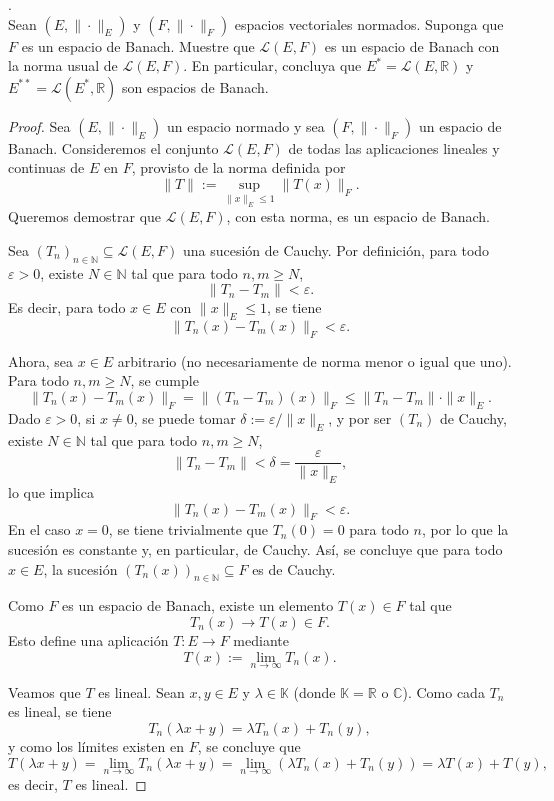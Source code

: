.\\
Sean $(E, \| \cdot \|_E)$ y $(F, \| \cdot \|_F)$ espacios vectoriales normados. Suponga que $F$ es un espacio de Banach. Muestre que $\mathcal{L}(E, F)$ es un espacio de Banach con la norma usual de $\mathcal{L}(E, F)$. En particular, concluya que $E^* = \mathcal{L}(E, \mathbb{R})$ y $E^{**} = \mathcal{L}(E^*, \mathbb{R})$ son espacios de Banach.
\hfill

\begin{proof}
\hfill

Sea \( (E, \|\cdot\|_E) \) un espacio normado y sea \( (F, \|\cdot\|_F) \) un espacio de Banach. Consideremos el conjunto \( \mathcal{L}(E, F) \) de todas las aplicaciones lineales y continuas de \( E \) en \( F \), provisto de la norma definida por
\[
\|T\| := \sup_{\|x\|_E \leq 1} \|T(x)\|_F.
\]
Queremos demostrar que \( \mathcal{L}(E, F) \), con esta norma, es un espacio de Banach.

Sea \( (T_n)_{n \in \mathbb{N}} \subseteq \mathcal{L}(E, F) \) una sucesión de Cauchy. Por definición, para todo \( \varepsilon > 0 \), existe \( N \in \mathbb{N} \) tal que para todo \( n, m \geq N \),
\[
\|T_n - T_m\| < \varepsilon.
\]
Es decir, para todo \( x \in E \) con \( \|x\|_E \leq 1 \), se tiene
\[
\|T_n(x) - T_m(x)\|_F < \varepsilon.
\]

Ahora, sea \( x \in E \) arbitrario (no necesariamente de norma menor o igual que uno). Para todo \( n, m \geq N \), se cumple
\[
\|T_n(x) - T_m(x)\|_F = \|(T_n - T_m)(x)\|_F \leq \|T_n - T_m\| \cdot \|x\|_E.
\]
Dado \( \varepsilon > 0 \), si \( x \neq 0 \), se puede tomar \( \delta := \varepsilon / \|x\|_E \), y por ser \( (T_n) \) de Cauchy, existe \( N \in \mathbb{N} \) tal que para todo \( n, m \geq N \),
\[
\|T_n - T_m\| < \delta = \frac{\varepsilon}{\|x\|_E},
\]
lo que implica
\[
\|T_n(x) - T_m(x)\|_F < \varepsilon.
\]
En el caso \( x = 0 \), se tiene trivialmente que \( T_n(0) = 0 \) para todo \( n \), por lo que la sucesión es constante y, en particular, de Cauchy. Así, se concluye que para todo \( x \in E \), la sucesión \( (T_n(x))_{n \in \mathbb{N}} \subseteq F \) es de Cauchy.

Como \( F \) es un espacio de Banach, existe un elemento \( T(x) \in F \) tal que
\[
T_n(x) \to T(x) \in F.
\]
Esto define una aplicación \( T: E \to F \) mediante
\[
T(x) := \lim_{n \to \infty} T_n(x).
\]

Veamos que \( T \) es lineal. Sean \( x, y \in E \) y \( \lambda \in \mathbb{K} \) (donde \( \mathbb{K} = \mathbb{R} \) o \( \mathbb{C} \)). Como cada \( T_n \) es lineal, se tiene
\[
T_n(\lambda x + y) = \lambda T_n(x) + T_n(y),
\]
y como los límites existen en \( F \), se concluye que
\[
T(\lambda x + y) = \lim_{n \to \infty} T_n(\lambda x + y) = \lim_{n \to \infty} (\lambda T_n(x) + T_n(y)) = \lambda T(x) + T(y),
\]
es decir, \( T \) es lineal.


\end{proof}
